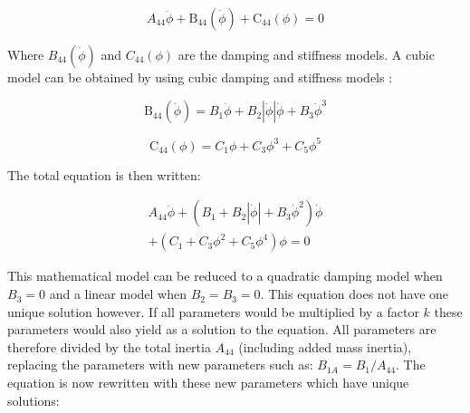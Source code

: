             
    
    \begin{equation}
A_{44} \ddot{\phi} + \operatorname{B_{44}}\left(\dot{\phi}\right) + \operatorname{C_{44}}\left(\phi\right) = 0
\label{eq:roll_decay_equation_general_himeno}
\end{equation}

    

    Where $B_{44}(\dot{\phi})$ and $C_{44}(\phi)$ are the damping and
stiffness models. A cubic model can be obtained by using cubic damping
\citep{7505983/FB64RGPF} and stiffness models \citep{7505983/KL7A3RIV}:
 
            
    
    \begin{equation}
\operatorname{B_{44}}\left(\dot{\phi}\right) = B_{1} \dot{\phi} + B_{2} \left|{\dot{\phi}}\right| \dot{\phi} + B_{3} \dot{\phi}^{3}
\label{eq:b44_cubic_equation}
\end{equation}

    
 
            
    
    \begin{equation}
\operatorname{C_{44}}\left(\phi\right) = C_{1} \phi + C_{3} \phi^{3} + C_{5} \phi^{5}
\label{eq:restoring_equation_cubic}
\end{equation}

    

    The total equation is then written:
 
            
    
    \begin{equation}
\begin{aligned}
A_{44} \ddot{\phi} + \left(B_{1} + B_{2} \left|{\dot{\phi}}\right| + B_{3} \dot{\phi}^{2}\right) \dot{\phi} \\ + \left(C_{1} + C_{3} \phi^{2} + C_{5} \phi^{4}\right) \phi = 0
\end{aligned}
\label{eq:roll_decay_equation_cubic}
\end{equation}

    

    This mathematical model can be reduced to a quadratic damping model when
$B_3=0$ and a linear model when $B_2=B_3=0$. This equation does not
have one unique solution however. If all parameters would be multiplied
by a factor $k$ these parameters would also yield as a solution to the
equation. All parameters are therefore divided by the total inertia
$A_{44}$ (including added mass inertia), replacing the parameters with
new parameters such as: $B_{1A} = B_1/A_{44}$. The equation is now
rewritten with these new parameters which have unique solutions:
 
